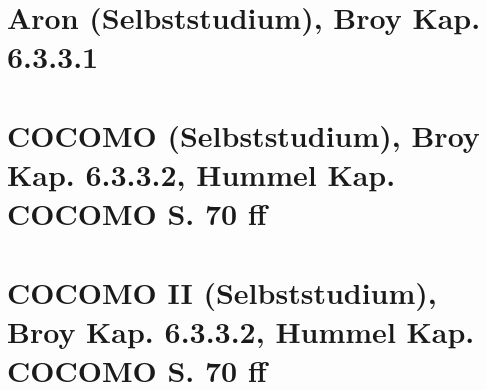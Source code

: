 \section{Aron (Selbststudium), Broy Kap. 6.3.3.1}

\section{COCOMO (Selbststudium), Broy Kap. 6.3.3.2, Hummel Kap. COCOMO S. 70 ff}

\section{COCOMO II (Selbststudium), Broy Kap. 6.3.3.2, Hummel Kap. COCOMO S. 70 ff}